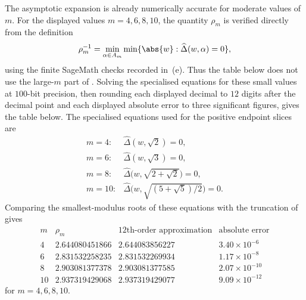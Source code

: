\begin{remark}

The asymptotic expansion is already numerically accurate for moderate
values of \(m\). For the displayed values \(m=4,6,8,10\), the quantity
\(\rho_m\) is verified directly from the definition
\[
  \rho_m^{-1}=\min_{\alpha\in A_m}\min\{\abs{w}:\widehat\Delta(w,\alpha)=0\},
\]
using the finite SageMath checks recorded in
\,\textup{(e)}. Thus the table below does
not use the large-\(m\) part of . Solving the
specialised equations for these small values at \(100\)-bit precision,
then rounding each displayed decimal to \(12\) digits after the decimal
point and each displayed absolute error to three significant figures,
gives the table below.
The specialised equations used for the positive endpoint slices are
\[
\begin{array}{ll}
m=4:  & \widehat\Delta(w,\sqrt2)=0,\\
m=6:  & \widehat\Delta(w,\sqrt3)=0,\\
m=8:  & \widehat\Delta\bigl(w,\sqrt{2+\sqrt2}\bigr)=0,\\
m=10: & \widehat\Delta\bigl(w,\sqrt{(5+\sqrt5)/2}\bigr)=0.
\end{array}
\]
Comparing the smallest-modulus roots of these equations with the
truncation of
 gives
\[
  \begin{array}{c|c|c|c}
    m & \rho_m & \text{12th-order approximation} & \text{absolute error} \\
    \hline
    4  & 2.644080451866 & 2.644083856227 & 3.40\times 10^{-6} \\
    6  & 2.831532258235 & 2.831532269934 & 1.17\times 10^{-8} \\
    8  & 2.903081377378 & 2.903081377585 & 2.07\times 10^{-10} \\
    10 & 2.937319429068 & 2.937319429077 & 9.09\times 10^{-12}
  \end{array}
\]
for \(m=4,6,8,10\).

\end{remark}










